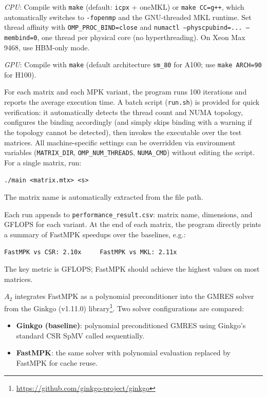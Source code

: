 \documentclass[conference]{IEEEtran}
\begin{document}

\emph{CPU}: Compile with \texttt{make} (default: \texttt{icpx} + oneMKL) or \texttt{make CC=g++}, which automatically switches to \texttt{-fopenmp} and the GNU-threaded MKL runtime. Set thread affinity with \texttt{OMP\_PROC\_BIND=close} and \texttt{numactl --physcpubind=... --membind=0}, one thread per physical core (no hyperthreading). On Xeon Max 9468, use HBM-only mode.

\emph{GPU}: Compile with \texttt{make} (default architecture \texttt{sm\_80} for A100; use \texttt{make ARCH=90} for H100).

\artcomp

For each matrix and each MPK variant, the program runs 100 iterations and reports the average execution time. A batch script (\texttt{run.sh}) is provided for quick verification: it automatically detects the thread count and NUMA topology, configures the binding accordingly (and simply skips binding with a warning if the topology cannot be detected), then invokes the executable over the test matrices. All machine-specific settings can be overridden via environment variables (\texttt{MATRIX\_DIR}, \texttt{OMP\_NUM\_THREADS}, \texttt{NUMA\_CMD}) without editing the script. For a single matrix, run:
\begin{center}
\texttt{./main <matrix.mtx> <s>}
\end{center}
The matrix name is automatically extracted from the file path.

\artout

Each run appends to \texttt{performance\_result.csv}: matrix name, dimensions, and GFLOPS for each variant. At the end of each matrix, the program directly prints a summary of FastMPK speedups over the baselines, e.g.:
\begin{center}
\texttt{FastMPK vs CSR: 2.10x ~ ~ FastMPK vs MKL: 2.11x}
\end{center}
The key metric is GFLOPS; FastMPK should achieve the highest values on most matrices.


\newartifact

\artrel

$A_2$ integrates FastMPK as a polynomial preconditioner into the GMRES solver from the Ginkgo (v1.11.0) library\footnote{\url{https://github.com/ginkgo-project/ginkgo}}. Two solver configurations are compared:

\begin{itemize}
  \item \textbf{Ginkgo (baseline)}: polynomial preconditioned GMRES using Ginkgo's standard CSR SpMV called sequentially.
  \item \textbf{FastMPK}: the same solver with polynomial evaluation replaced by FastMPK for cache reuse.
\end{itemize}
\end{document}
